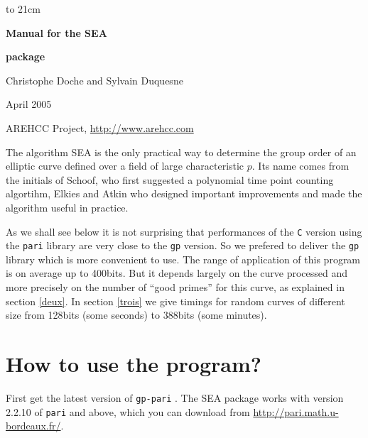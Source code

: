 \documentclass[11pt]{article}
\begin{document}
\thispagestyle{empty}
\vbox to 21cm {
\vskip 8.5cm
\centerline{\bf \Huge \bfseries Manual for the SEA}\par
\bigskip
\bigskip
\centerline{\bf \Huge \bfseries package}\par
\medskip
\bigskip
\vskip 1cm
\centerline{\Large {\sc Christophe Doche and Sylvain Duquesne}}\par
\bigskip
\centerline{\Large April 2005}\vfill
\centerline{\Large AREHCC Project, \url{http://www.arehcc.com}}\par
\bigskip
}
\vfill\eject
\setcounter{tocdepth}{3}
\cleardoublepage

The algorithm SEA is the only practical way to determine the group order of an
elliptic curve defined over a field of large characteristic $p$. Its name comes
from the initials of Schoof, who first suggested a polynomial time point
counting algortihm, Elkies and Atkin who designed important improvements and
made the algorithm useful in practice.

As we shall see below it is not surprising that performances of the {\tt C}
version using the {\tt pari} library are very close to the {\tt gp} version. So
we prefered to deliver the {\tt gp} library which is more convenient to use.
The range of application of this program is on average up to 400bits. But it
depends largely on the curve processed and more precisely on the number of
``good primes'' for this curve, as explained in section \ref{deux}. In section
\ref{trois} we give timings for random curves of different size from 128bits
(some seconds) to 388bits (some minutes).

\section{How to use the program?}

First get the latest version of {\tt gp-pari} \cite{bbco00}. The SEA package
works with version 2.2.10 of {\tt pari} and above, which you can download
from \url{http://pari.math.u-bordeaux.fr/}.
\end{document}
